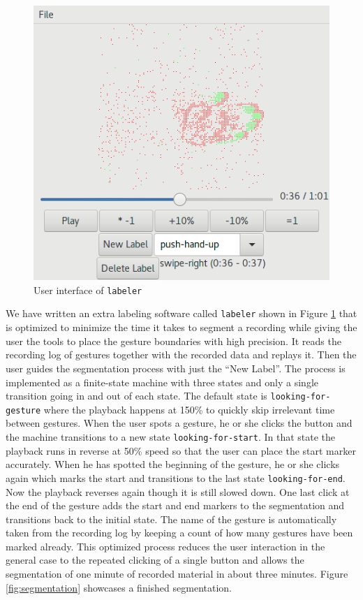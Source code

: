 \begin{figure}
  \centering
  \includegraphics{figures/dataset/labeler.png}
  \caption{User interface of \texttt{labeler}}
  \label{fig:labeler}
\end{figure}

We have written an extra labeling software called \texttt{labeler} shown in
Figure \ref{fig:labeler} that is optimized to minimize the time it takes to
segment a recording while giving the user the tools to place the gesture
boundaries with high precision. It reads the recording log of gestures together
with the recorded data and replays it. Then the user guides the segmentation
process with just the ``New Label''. The process is implemented as a
finite-state machine with three states and only a single transition going in and
out of each state. The default state is \texttt{looking-for-gesture} where the
playback happens at 150\% to quickly skip irrelevant time between gestures. When
the user spots a gesture, he or she clicks the button and the machine
transitions to a new state \texttt{looking-for-start}. In that state the
playback runs in reverse at 50\% speed so that the user can place the start
marker accurately. When he has spotted the beginning of the gesture, he or she
clicks again which marks the start and transitions to the last state
\texttt{looking-for-end}. Now the playback reverses again though it is still
slowed down. One last click at the end of the gesture adds the start and end
markers to the segmentation and transitions back to the initial state. The name
of the gesture is automatically taken from the recording log by keeping a count
of how many gestures have been marked already. This optimized process reduces
the user interaction in the general case to the repeated clicking of a single
button and allows the segmentation of one minute of recorded material in about
three minutes. Figure \ref{fig:segmentation} showcases a finished segmentation.


